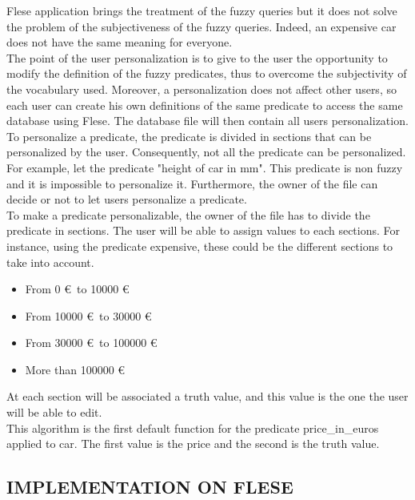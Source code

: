\documentclass[a4paper,twoside]{article}
\begin{document}
Flese application brings the treatment of the fuzzy queries but it does not solve the problem of the subjectiveness of the fuzzy queries. Indeed, an expensive car does not have the same meaning for everyone.\\

The point of the user personalization is to give to the user the opportunity to modify the definition of the fuzzy predicates, thus to overcome the subjectivity of the vocabulary used. Moreover, a personalization does not affect other users, so each user can create his own definitions of the same predicate to access the same database using Flese. The database file will then contain all users personalization.\\

To personalize a predicate, the predicate is divided in sections that can be personalized by the user. Consequently, not all the predicate can be personalized. For example, let the predicate "height of car in mm". This predicate is non fuzzy and it is impossible to personalize it. Furthermore, the owner of the file can decide or not to let users personalize a predicate. \\

To make a predicate personalizable, the owner of the file has to divide the predicate in sections. The user will be able to assign values to each sections. For instance, using the predicate expensive, these could be the different sections to take into account.

\begin{itemize}
    \item From 0 \euro\ to 10000 \euro
    \item  From 10000 \euro\ to 30000 \euro
    \item  From 30000 \euro\ to 100000 \euro
    \item  More than 100000 \euro
\end{itemize}

At each section will be associated a truth value, and this value is the one the user will be able to edit.\\

This algorithm is the first default function for the predicate price\_in\_euros applied to car. The first value is the price and the second is the truth value. \\

\subsection{\uppercase{Implementation on Flese}}
\end{document}
